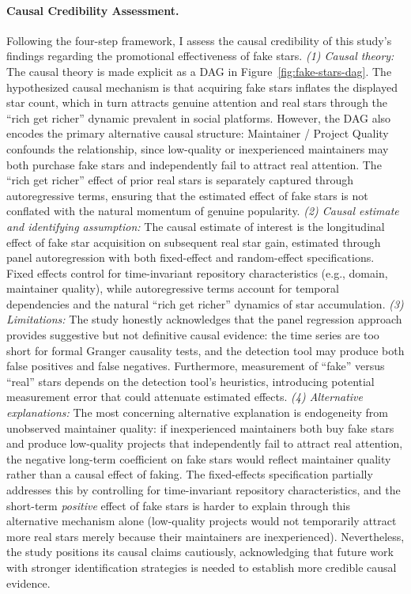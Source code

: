 \paragraph{Causal Credibility Assessment.}
Following the four-step framework, I assess the causal credibility of this study's findings regarding the promotional effectiveness of fake stars.
\emph{(1) Causal theory:} The causal theory is made explicit as a DAG in Figure~\ref{fig:fake-stars-dag}.
The hypothesized causal mechanism is that acquiring fake stars inflates the displayed star count, which in turn attracts genuine attention and real stars through the ``rich get richer'' dynamic prevalent in social platforms.
However, the DAG also encodes the primary alternative causal structure: Maintainer / Project Quality confounds the relationship, since low-quality or inexperienced maintainers may both purchase fake stars and independently fail to attract real attention.
The ``rich get richer'' effect of prior real stars is separately captured through autoregressive terms, ensuring that the estimated effect of fake stars is not conflated with the natural momentum of genuine popularity.
\emph{(2) Causal estimate and identifying assumption:} The causal estimate of interest is the longitudinal effect of fake star acquisition on subsequent real star gain, estimated through panel autoregression with both fixed-effect and random-effect specifications.
Fixed effects control for time-invariant repository characteristics (e.g., domain, maintainer quality), while autoregressive terms account for temporal dependencies and the natural ``rich get richer'' dynamics of star accumulation.
\emph{(3) Limitations:} The study honestly acknowledges that the panel regression approach provides suggestive but not definitive causal evidence: the time series are too short for formal Granger causality tests, and the detection tool may produce both false positives and false negatives.
Furthermore, measurement of ``fake'' versus ``real'' stars depends on the detection tool's heuristics, introducing potential measurement error that could attenuate estimated effects.
\emph{(4) Alternative explanations:} The most concerning alternative explanation is endogeneity from unobserved maintainer quality: if inexperienced maintainers both buy fake stars and produce low-quality projects that independently fail to attract real attention, the negative long-term coefficient on fake stars would reflect maintainer quality rather than a causal effect of faking.
The fixed-effects specification partially addresses this by controlling for time-invariant repository characteristics, and the short-term \emph{positive} effect of fake stars is harder to explain through this alternative mechanism alone (low-quality projects would not temporarily attract more real stars merely because their maintainers are inexperienced).
Nevertheless, the study positions its causal claims cautiously, acknowledging that future work with stronger identification strategies %
is needed to establish more credible causal evidence.

